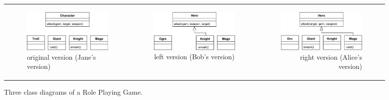 \begin{figure}
    \begin{tabular}{l|c|r}
        \begin{subfigure}[t]{0.31\linewidth}
            \includegraphics[width=\linewidth]{class_diagram_origin}
            \caption{original version (Jane's version)}
            \label{fig:class_diagram_origin}
        \end{subfigure}
        &
        \begin{subfigure}[t]{0.31\linewidth}
            \includegraphics[width=\linewidth]{class_diagram_left}
            \caption{left version (Bob's version)}
            \label{fig:class_diagram_left}
        \end{subfigure}
        &
        \begin{subfigure}[t]{0.31\linewidth}
            \includegraphics[width=\linewidth]{class_diagram_right}
            \caption{right version (Alice's version)}
            \label{fig:class_diagram_right}
        \end{subfigure}
    \end{tabular}
    \caption{Three class diagrams of a Role Playing Game.}
    \label{fig:class_diagram_rpg}
\end{figure}

